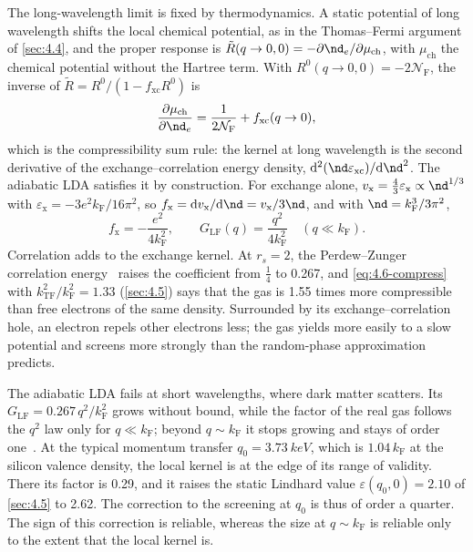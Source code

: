 The long-wavelength limit is fixed by thermodynamics. A static potential of long wavelength shifts the local chemical potential, as in the Thomas--Fermi argument of \cref{sec:4.4}, and the proper response is $\tilde R(q\to0,0) = -\partial\nd_e/\partial\mu_{\mathrm{ch}}$, with $\mu_{\mathrm{ch}}$ the chemical potential without the Hartree term. With $R^0(q\to0,0) = -2\mathcal{N}_{\mathrm{F}}$, the inverse of $\tilde R = R^0/(1 - f_{\mathrm{xc}}R^0)$ is
\begin{equation}
  \frac{\partial\mu_{\mathrm{ch}}}{\partial\nd_e} = \frac{1}{2\mathcal{N}_{\mathrm{F}}} + f_{\mathrm{xc}}(q\to0) ,
  \label{eq:4.6-compress}
\end{equation}
which is the compressibility sum rule: the kernel at long wavelength is the second derivative of the exchange--correlation energy density, $\dd^2(\nd\varepsilon_{\mathrm{xc}})/\dd\nd^2$. The adiabatic LDA satisfies it by construction. For exchange alone, $v_{\mathrm{x}} = \tfrac43\varepsilon_{\mathrm{x}} \propto \nd^{1/3}$ with $\varepsilon_{\mathrm{x}} = -3e^2k_{\mathrm{F}}/16\pi^2$, so $f_{\mathrm{x}} = \dd v_{\mathrm{x}}/\dd\nd = v_{\mathrm{x}}/3\nd$, and with $\nd = k_{\mathrm{F}}^3/3\pi^2$,
\begin{equation*}
  f_{\mathrm{x}} = -\frac{e^2}{4k_{\mathrm{F}}^2}, \qquad G_{\mathrm{LF}}(q) = \frac{q^2}{4k_{\mathrm{F}}^2}\quad (q \ll k_{\mathrm{F}}) .
\end{equation*}
Correlation adds to the exchange kernel. At $r_s = 2$, the Perdew--Zunger correlation energy~\cite{perdew1981self} raises the coefficient from $\tfrac14$ to 0.267, and \cref{eq:4.6-compress} with $k_{\mathrm{TF}}^2/k_{\mathrm{F}}^2 = 1.33$ (\cref{sec:4.5}) says that the gas is 1.55 times more compressible than free electrons of the same density. Surrounded by its exchange--correlation hole, an electron repels other electrons less; the gas yields more easily to a slow potential and screens more strongly than the random-phase approximation predicts.

The adiabatic LDA fails at short wavelengths, where dark matter scatters. Its $G_{\mathrm{LF}} = 0.267\,q^2/k_{\mathrm{F}}^2$ grows without bound, while the factor of the real gas follows the $q^2$ law only for $q \ll k_{\mathrm{F}}$; beyond $q \sim k_{\mathrm{F}}$ it stops growing and stays of order one~\cite[Chap.~5]{giuliani2005quantum}. At the typical momentum transfer $q_0 = \SI{3.73}{keV}$, which is $1.04\,k_{\mathrm{F}}$ at the silicon valence density, the local kernel is at the edge of its range of validity. There its factor is 0.29, and it raises the static Lindhard value $\varepsilon(q_0,0) = 2.10$ of \cref{sec:4.5} to 2.62. The correction to the screening at $q_0$ is thus of order a quarter. The sign of this correction is reliable, whereas the size at $q \sim k_{\mathrm{F}}$ is reliable only to the extent that the local kernel is.

